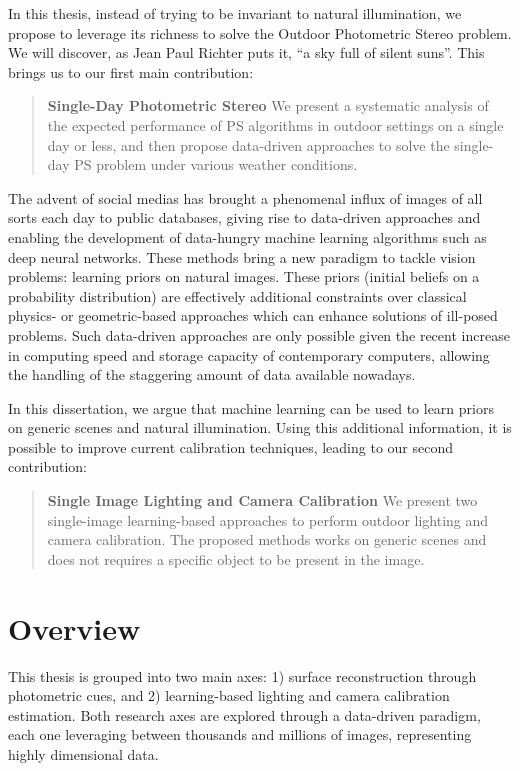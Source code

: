 In this thesis, instead of trying to be invariant to natural illumination, we propose to leverage its richness to solve the Outdoor Photometric Stereo problem. We will discover, as Jean Paul Richter puts it, ``a sky full of silent suns''. This brings us to our first main contribution:
\begin{quotation}
\textbf{Single-Day Photometric Stereo} We present a systematic analysis of the expected performance of PS algorithms in outdoor settings on a single day or less, and then propose data-driven approaches to solve the single-day PS problem under various weather conditions.
\end{quotation}

The advent of social medias has brought a phenomenal influx of images of all sorts each day to public databases, giving rise to data-driven approaches and enabling the development of data-hungry machine learning algorithms such as deep neural networks. These methods bring a new paradigm to tackle vision problems: learning priors on natural images. These priors (initial beliefs on a probability distribution) are effectively additional constraints over classical physics- or geometric-based approaches which can enhance solutions of ill-posed problems. Such data-driven approaches are only possible given the recent increase in computing speed and storage capacity of contemporary computers, allowing the handling of the staggering amount of data available nowadays.

In this dissertation, we argue that machine learning can be used to learn priors on generic scenes and natural illumination. Using this additional information, it is possible to improve current calibration techniques, leading to our second contribution:
\begin{quotation}
\textbf{Single Image Lighting and Camera Calibration} We present two single-image learning-based approaches to perform outdoor lighting and camera calibration. The proposed methods works on generic scenes and does not requires a specific object to be present in the image.
\end{quotation}


\section*{Overview}

This thesis is grouped into two main axes: 1) surface reconstruction through photometric cues, and 2) learning-based lighting and camera calibration estimation. Both research axes are explored through a data-driven paradigm, each one leveraging between thousands and millions of images, representing highly dimensional data.

